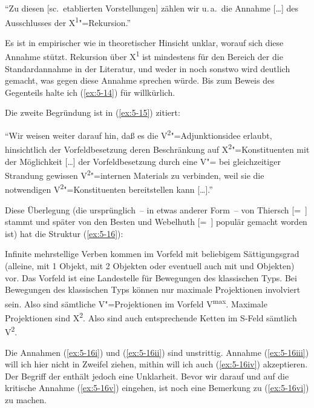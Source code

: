 \documentclass[output=paper]{LSP/langsci}
\begin{document}
\begin{exe}
\ex%
\label{ex:5-14}
"`Zu diesen [sc.\ etablierten Vorstellungen] zählen wir u.\,a.\ die Annahme [\ldots] des Ausschlusses der X\textsuperscript{1}{}"=Rekursion."' \citep[3]{FreyTappe1991}
\end{exe}
Es ist in empirischer wie in theoretischer Hinsicht unklar, worauf sich diese Annahme stützt. Rekursion über X\textsuperscript{1} ist mindestens für den Bereich der  die Standardannahme in der Literatur, und weder in \citet{FreyTappe1991} noch sonstwo wird deutlich gemacht, was gegen diese Annahme sprechen würde. Bis zum Beweis des Gegenteils halte ich (\ref{ex:5-14}) für willkürlich.

Die zweite Begründung ist in (\ref{ex:5-15}) zitiert:

\begin{exe}
\ex%
\label{ex:5-15}
"`Wir weisen weiter darauf hin, daß es die V\textsuperscript{2}{}"=Adjunktionsidee erlaubt, hinsichtlich der Vorfeldbesetzung deren Beschränkung auf X\textsuperscript{2}{}"=Konstituenten mit der Möglichkeit [\ldots] der Vorfeldbesetzung durch eine V"= bei gleichzeitiger Strandung gewissen V\textsuperscript{2}{}"=internen Materials zu verbinden, weil sie die notwendigen V\textsuperscript{2}{}"=Konstituenten bereitstellen kann [\ldots]."' \citep[5]{FreyTappe1991}
\end{exe}
Diese Überlegung (die ursprünglich~-- in etwas anderer Form~-- von Thiersch\label{proj-eckig1} [=~\citet{Thiersch1985}] stammt und später von den Besten und Webelhuth [=~\citet{WdB87a}] populär gemacht worden ist) hat die Struktur (\ref{ex:5-16}):


\begin{exe}
\ex%
\label{ex:5-16}
\begin{xlisti}
\ex%
\label{ex:5-16i}
Infinite mehrstellige Verben kommen im Vorfeld mit beliebigem
Sättigungsgrad (\dash alleine, mit 1 Objekt, mit 2 Objekten oder
eventuell auch mit  und Objekten) vor.
\ex%
\label{ex:5-16ii}
Das Vorfeld ist eine Landestelle für Bewegungen des klassischen Typs.
\ex%
\label{ex:5-16iii}
Bei Bewegungen des klassischen Typs können nur maximale Projektionen involviert sein.
\ex%
\label{ex:5-16iv}
Also sind sämtliche V"=Projektionen im Vorfeld V\textsuperscript{max}.
\ex%
\label{ex:5-16v}
Maximale Projektionen sind X\textsuperscript{2}.
\ex%
\label{ex:5-16vi}
Also sind auch entsprechende Ketten im S-Feld sämtlich V\textsuperscript{2}.
\end{xlisti}
\end{exe}
Die Annahmen (\ref{ex:5-16i}) und (\ref{ex:5-16ii}) sind
unstrittig. Annahme (\ref{ex:5-16iii}) will ich hier nicht in Zweifel
ziehen, mithin will ich auch (\ref{ex:5-16iv}) akzeptieren. Der
Begriff der  enthält jedoch eine
Unklarheit. Bevor wir darauf und auf die kritische Annahme (\ref{ex:5-16v})
eingehen, ist noch eine Bemerkung zu (\ref{ex:5-16vi}) zu machen.
\end{document}
